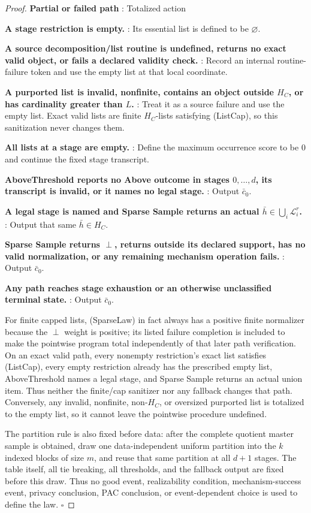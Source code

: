 \begin{proof}
\noindent\textbf{ Partial or failed path }:  Totalized action \par
\noindent\textbf{ A stage restriction is empty. }:  Its essential list is defined to be \(\varnothing\). \par
\noindent\textbf{ A source decomposition/list routine is undefined, returns no exact valid object, or fails a declared validity check. }:  Record an internal routine-failure token and use the empty list at that local coordinate. \par
\noindent\textbf{ A purported list is invalid, nonfinite, contains an object outside \(H_C\), or has cardinality greater than \(L\). }:  Treat it as a source failure and use the empty list. Exact valid lists are finite \(H_C\)-lists satisfying (ListCap), so this sanitization never changes them. \par
\noindent\textbf{ All lists at a stage are empty. }:  Define the maximum occurrence score to be \(0\) and continue the fixed stage transcript. \par
\noindent\textbf{ AboveThreshold reports no Above outcome in stages \(0,\ldots,d\), its transcript is invalid, or it names no legal stage. }:  Output \(\bar c_0\). \par
\noindent\textbf{ A legal stage is named and Sparse Sample returns an actual \(\bar h\in\bigcup_i\mathcal L_i^r\). }:  Output that same \(\bar h\in H_C\). \par
\noindent\textbf{ Sparse Sample returns \(\perp\), returns outside its declared support, has no valid normalization, or any remaining mechanism operation fails. }:  Output \(\bar c_0\). \par
\noindent\textbf{ Any path reaches stage exhaustion or an otherwise unclassified terminal state. }:  Output \(\bar c_0\). \par

For finite capped lists, (SparseLaw) in fact always has a positive finite
normalizer because the \(\perp\) weight is positive; its listed failure
completion is included to make the pointwise program total independently of
that later path verification. On an exact valid path, every nonempty
restriction's exact list satisfies (ListCap), every empty restriction already
has the prescribed empty list, AboveThreshold names a legal stage, and Sparse
Sample returns an actual union item. Thus neither the finite/cap sanitizer nor
any fallback changes that path. Conversely, any invalid, nonfinite,
non-\(H_C\), or oversized purported list is totalized to the empty list, so
it cannot leave the pointwise procedure undefined.

The partition rule is also fixed before data: after the complete quotient
master sample is obtained, draw one data-independent uniform partition into
the \(k\) indexed blocks of size \(m\), and reuse that same partition at all
\(d+1\) stages. The table itself, all tie breaking, all thresholds, and the
fallback output are fixed before this draw. Thus no good event, realizability
condition, mechanism-success event, privacy conclusion, PAC conclusion, or
event-dependent choice is used to define the law. \(\square\)


\end{proof}

